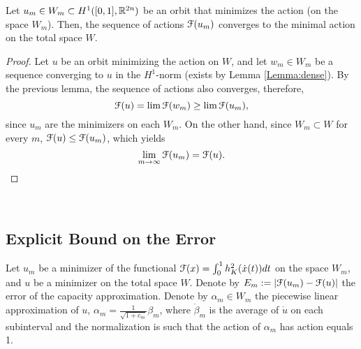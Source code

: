\documentclass[../capacities_main.tex]{subfiles}
\begin{document}
\begin{Lemma}
	Let $u_m\in W_m\subset H^1([0,1],{\mathbb R}^{2n})$ be an orbit that minimizes the action (on the space $W_m$). Then, the sequence of actions ${\mathcal F}(u_m)$ converges to the minimal action on the total space $W$. 
\end{Lemma}

\begin{proof}
	Let $u$ be an orbit minimizing the action on $W$, and let $w_m\in W_m$ be a sequence converging to $u$ in the $H^1$-norm (exists by Lemma \autoref{Lemma:dense}). By the previous lemma, the sequence of actions also converges, therefore,
	\[
	{\mathcal F}(u)=\lim {\mathcal F}(w_m)\geq \lim {\mathcal F}(u_m),
	\]
	since $u_m$ are the minimizers on each $W_m$. On the other hand, since $W_m\subset W$ for every $m$, ${\mathcal F}(u)\leq {\mathcal F}(u_m)$, which yields 
	\[
	\lim_{m\rightarrow\infty}{\mathcal F}(u_m)={\mathcal F}(u).
	\]
\end{proof}\

\subsection{Explicit Bound on the Error}

Let $u_m$ be a minimizer of the functional ${\mathcal F}(x)=\int_0^1 h_K^2 (\dot x(t))dt$ on the space $W_m$, and $u$ be a minimizer on the total space $W$. Denote by $E_m:=|{\mathcal F} (u_m)-{\mathcal F}(u)|$ the error of the capacity approximation. Denote by $\alpha_m\in W_m$ the piecewise linear approximation of $u$, $\alpha_m=\frac{1}{\sqrt{1+c_m}}\beta_m$, where $\dot\beta_m$ is the average of $\dot u$ on each subinterval and the normalization is such that the action of $\alpha_m$ has action equals 1. %
\end{document}
